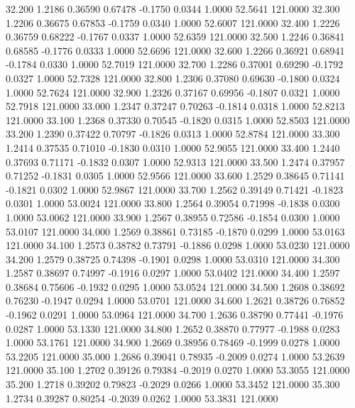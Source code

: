   32.200   1.2186   0.36590   0.67478  -0.1750   0.0344   1.0000  52.5641 121.0000
  32.300   1.2206   0.36675   0.67853  -0.1759   0.0340   1.0000  52.6007 121.0000
  32.400   1.2226   0.36759   0.68222  -0.1767   0.0337   1.0000  52.6359 121.0000
  32.500   1.2246   0.36841   0.68585  -0.1776   0.0333   1.0000  52.6696 121.0000
  32.600   1.2266   0.36921   0.68941  -0.1784   0.0330   1.0000  52.7019 121.0000
  32.700   1.2286   0.37001   0.69290  -0.1792   0.0327   1.0000  52.7328 121.0000
  32.800   1.2306   0.37080   0.69630  -0.1800   0.0324   1.0000  52.7624 121.0000
  32.900   1.2326   0.37167   0.69956  -0.1807   0.0321   1.0000  52.7918 121.0000
  33.000   1.2347   0.37247   0.70263  -0.1814   0.0318   1.0000  52.8213 121.0000
  33.100   1.2368   0.37330   0.70545  -0.1820   0.0315   1.0000  52.8503 121.0000
  33.200   1.2390   0.37422   0.70797  -0.1826   0.0313   1.0000  52.8784 121.0000
  33.300   1.2414   0.37535   0.71010  -0.1830   0.0310   1.0000  52.9055 121.0000
  33.400   1.2440   0.37693   0.71171  -0.1832   0.0307   1.0000  52.9313 121.0000
  33.500   1.2474   0.37957   0.71252  -0.1831   0.0305   1.0000  52.9566 121.0000
  33.600   1.2529   0.38645   0.71141  -0.1821   0.0302   1.0000  52.9867 121.0000
  33.700   1.2562   0.39149   0.71421  -0.1823   0.0301   1.0000  53.0024 121.0000
  33.800   1.2564   0.39054   0.71998  -0.1838   0.0300   1.0000  53.0062 121.0000
  33.900   1.2567   0.38955   0.72586  -0.1854   0.0300   1.0000  53.0107 121.0000
  34.000   1.2569   0.38861   0.73185  -0.1870   0.0299   1.0000  53.0163 121.0000
  34.100   1.2573   0.38782   0.73791  -0.1886   0.0298   1.0000  53.0230 121.0000
  34.200   1.2579   0.38725   0.74398  -0.1901   0.0298   1.0000  53.0310 121.0000
  34.300   1.2587   0.38697   0.74997  -0.1916   0.0297   1.0000  53.0402 121.0000
  34.400   1.2597   0.38684   0.75606  -0.1932   0.0295   1.0000  53.0524 121.0000
  34.500   1.2608   0.38692   0.76230  -0.1947   0.0294   1.0000  53.0701 121.0000
  34.600   1.2621   0.38726   0.76852  -0.1962   0.0291   1.0000  53.0964 121.0000
  34.700   1.2636   0.38790   0.77441  -0.1976   0.0287   1.0000  53.1330 121.0000
  34.800   1.2652   0.38870   0.77977  -0.1988   0.0283   1.0000  53.1761 121.0000
  34.900   1.2669   0.38956   0.78469  -0.1999   0.0278   1.0000  53.2205 121.0000
  35.000   1.2686   0.39041   0.78935  -0.2009   0.0274   1.0000  53.2639 121.0000
  35.100   1.2702   0.39126   0.79384  -0.2019   0.0270   1.0000  53.3055 121.0000
  35.200   1.2718   0.39202   0.79823  -0.2029   0.0266   1.0000  53.3452 121.0000
  35.300   1.2734   0.39287   0.80254  -0.2039   0.0262   1.0000  53.3831 121.0000
